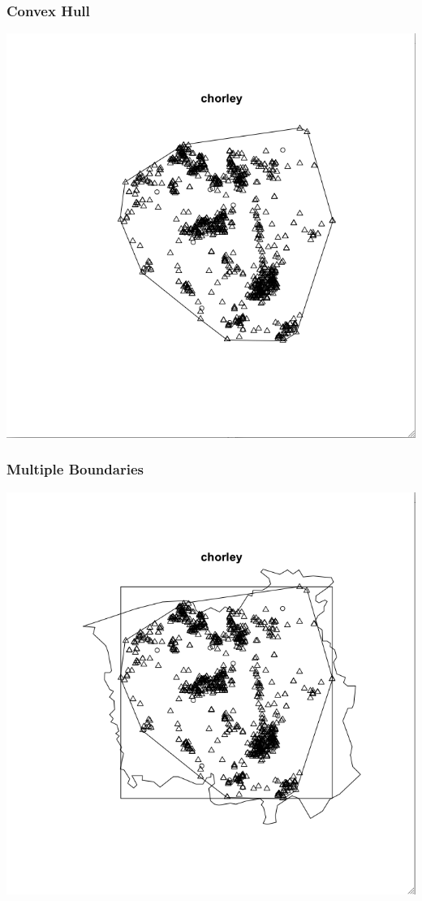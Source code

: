 \documentclass[nototal]{beamer}
\begin{document}

    \begin{frame}
      \frametitle{Convex Hull}
      \begin{center}
	\includegraphics[width=.65\linewidth]{chorleyhull.png}
      \end{center}
    \end{frame}

    \begin{frame}
      \frametitle{Multiple Boundaries}
      \begin{center}
	\includegraphics[width=.65\linewidth]{chorleyall.png}
      \end{center}
    \end{frame}
\end{document}
